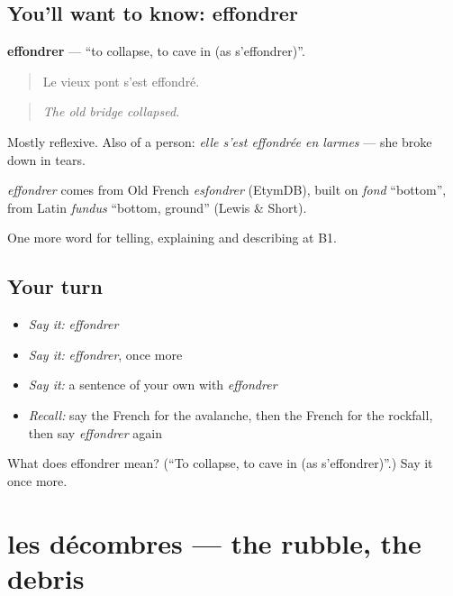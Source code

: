 \subsection*{You'll want to know: effondrer}
\textbf{effondrer} — \textquotedblleft{}to collapse, to cave in (as s'effondrer)\textquotedblright{}.

\begin{quote}
Le vieux pont s'est effondré.
\end{quote}

\begin{quote}
\emph{The old bridge collapsed.}
\end{quote}

Mostly reflexive. Also of a person: \emph{elle s'est effondrée en larmes} — she broke down in tears.

\begin{cousinweb}
\emph{effondrer} comes from Old French \emph{esfondrer} (EtymDB), built on \emph{fond} \textquotedblleft{}bottom\textquotedblright{}, from Latin \emph{fundus} \textquotedblleft{}bottom, ground\textquotedblright{} (Lewis \& Short).
\end{cousinweb}

\begin{grammarlens}[title={What you've built}]
One more word for telling, explaining and describing at B1.
\end{grammarlens}

\subsection*{Your turn}
\begin{itemize}
\raggedright
  \item \emph{Say it:} \emph{effondrer}
  \item \emph{Say it:} \emph{effondrer}, once more
  \item \emph{Say it:} a sentence of your own with \emph{effondrer}
  \item \emph{Recall:} say the French for the avalanche, then the French for the rockfall, then say \emph{effondrer} again
\end{itemize}

\begin{tcolorbox}[breakable,colback=teal!4,colframe=teal!35!black,title={Before you move on}]
What does effondrer mean? (\textquotedblleft{}To collapse, to cave in (as s'effondrer)\textquotedblright{}.) Say it once more.
\end{tcolorbox}
\section[les décombres]{les décombres — the rubble, the debris}

